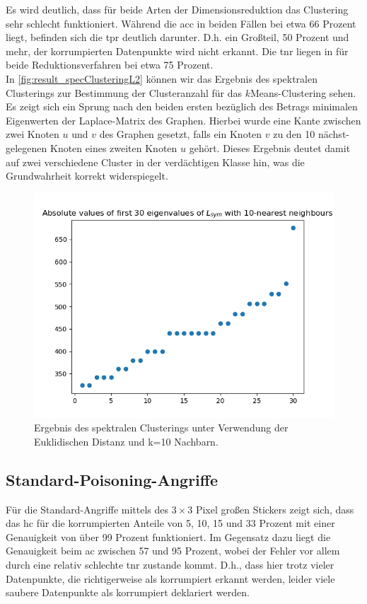 \documentclass[twoside, 12pt,a4paper]{book}
\numberwithin{equation}{section}
\begin{document}
	\noindent Es wird deutlich, dass für beide Arten der Dimensionsreduktion das Clustering sehr schlecht funktioniert. Während die \ac{acc} in beiden Fällen bei etwa 66 Prozent liegt, befinden sich die \ac{tpr} deutlich darunter. D.h. ein Großteil, 50 Prozent und mehr, der korrumpierten Datenpunkte wird nicht erkannt. Die \ac{tnr} liegen in für beide Reduktionsverfahren bei etwa 75 Prozent.\\
	
	

	\noindent In \autoref{fig:result_specClusteringL2} können wir das Ergebnis des spektralen Clusterings zur Bestimmung der Clusteranzahl für das $k$Means-Clustering sehen. Es zeigt sich ein Sprung nach den beiden ersten bezüglich des Betrags minimalen Eigenwerten der Laplace-Matrix des Graphen. Hierbei wurde eine Kante zwischen zwei Knoten $u$ und $v$ des Graphen gesetzt, falls ein Knoten $v$ zu den 10 nächst-gelegenen Knoten eines zweiten Knoten $u$ gehört. Dieses Ergebnis deutet damit auf zwei verschiedene Cluster in der verdächtigen Klasse hin, was die Grundwahrheit korrekt widerspiegelt.
	
	
	\begin{figure}[h]
		\begin{center}
			\includegraphics[width=0.5\textheight]{specClustering_l2_k10.png}
			\caption{Ergebnis des spektralen Clusterings unter Verwendung der Euklidischen Distanz und k=10 Nachbarn.}
			\label{fig:result_specClusteringL2}
		\end{center}
	\end{figure}
	\newpage
	\subsection{Standard-Poisoning-Angriffe}
	 Für die Standard-Angriffe mittels des $3 \times 3$ Pixel großen Stickers zeigt sich, dass das \ac{hc} für die korrumpierten Anteile von 5, 10, 15 und 33 Prozent mit einer Genauigkeit von über 99 Prozent funktioniert. Im Gegensatz dazu liegt die Genauigkeit beim \ac{ac} zwischen 57 und 95 Prozent, wobei der Fehler vor allem durch eine relativ schlechte \ac{tnr} zustande kommt. D.h., dass hier trotz vieler Datenpunkte, die richtigerweise als korrumpiert erkannt werden, leider viele saubere Datenpunkte als korrumpiert deklariert werden.
	 
\end{document}
